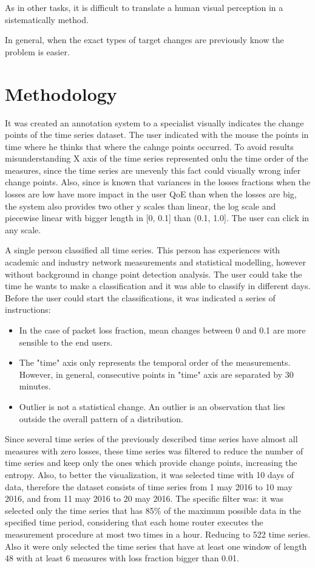 As in other tasks, it is difficult to translate a human visual perception in a sistematically method.

In general, when the exact types of target changes are previously know the problem is easier.

\section{Methodology}

It was created an annotation system to a specialist visually indicates the change points of the time series dataset. The user indicated with the mouse the points in time where he thinks that where the cahnge points occurred. To avoid results misunderstanding X axis of the time series represented onlu the time order of the measures, since the time series are unevenly this fact could visually wrong infer change points. Also, since is known that variances in the losses fractions when the losses are low have more impact in the user QoE than when the losses are big, the system also provides two other y scales than linear, the log scale and piecewise linear with bigger length in [0, 0.1] than (0.1, 1.0]. The user can click in any scale.

A single person classified all time series. This person has experiences with academic and industry network measurements and statistical modelling, however without background in change point detection analysis. The user could take the time he wants to make a classification and it was able to classify in different days. Before the user could start the classifications, it was indicated a series of instructions: 

\begin{itemize}
    \item In the case of packet loss fraction, mean changes between 0 and 0.1 are more sensible to the end users.
    \item The "time" axis only represents the temporal order of the measurements. However, in general, consecutive points in "time" axis are separated by 30 minutes.
    \item Outlier is not a statistical change. An outlier is an observation that lies outside the overall pattern of a distribution.
\end{itemize}

Since several time series of the previously described time series have almost all measures with zero losses, these time series was filtered to reduce the number of time series and keep only the ones which provide change points, increasing the entropy. Also, to better the visualization, it was selected time with 10 days of data, therefore the dataset consists of time series from 1 may 2016 to 10 may 2016, and from 11 may 2016 to 20 may 2016. The specific filter was: it was selected only the time series that has 85\% of the maximum possible data in the specified time period, considering that each home router executes the measurement procedure at most two times in a hour. Reducing to 522 time series. Also it were only selected the time series that have at least one window of length 48 with at least 6 measures with loss fraction bigger than 0.01.

